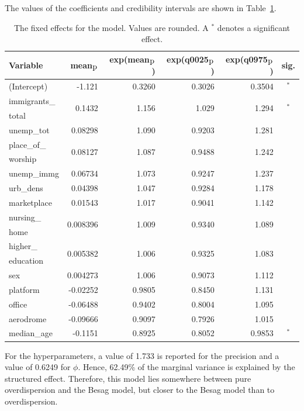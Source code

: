 %     
The values of the coefficients and credibility intervals are shown in Table~\ref{fixedAllNorway_spatial}.
\begin{table}[H]
\caption{The fixed effects for the model. Values are rounded. A $^*$ denotes a significant effect. \label{fixedAllNorway_spatial}}
\begin{tabular}{l r r r r c}
\toprule
\textbf{Variable}	& \textbf{mean$_{\hbox{p}}$}	& \textbf{exp(mean$_{\hbox{p}}$)} & \textbf{exp(q0025$_{\hbox{p}}$)} & \textbf{exp(q0975$_{\hbox{p}}$)} & \textbf{sig.}\\
\midrule
(Intercept) & -1.121 & 0.3260 & 0.3026 & 0.3504 & $^*$ \\
immigrants\_ & \multirow{2}{*}{0.1432} & \multirow{2}{*}{1.156} & \multirow{2}{*}{1.029} & \multirow{2}{*}{1.294} & \multirow{2}{*}{$^*$} \\
total \\
unemp\_tot & 0.08298 & 1.090 & 0.9203 & 1.281 \\
place\_of\_ & \multirow{2}{*}{0.08127} & \multirow{2}{*}{1.087} & \multirow{2}{*}{0.9488} & \multirow{2}{*}{1.242} \\
worship \\
unemp\_immg & 0.06734 & 1.073 & 0.9247 & 1.237 & \\
urb\_dens & 0.04398 & 1.047 & 0.9284 & 1.178 \\
marketplace & 0.01543 & 1.017 & 0.9041 & 1.142 \\
nursing\_ & \multirow{2}{*}{0.008396} & \multirow{2}{*}{1.009} & \multirow{2}{*}{0.9340} & \multirow{2}{*}{1.089} \\
home \\
higher\_ & \multirow{2}{*}{0.005382} & \multirow{2}{*}{1.006} & \multirow{2}{*}{0.9325} & \multirow{2}{*}{1.083} \\
education\\
sex & 0.004273 & 1.006 & 0.9073 & 1.112\\
platform & -0.02252 & 0.9805 & 0.8450 & 1.131 \\
office & -0.06488 & 0.9402 & 0.8004 & 1.095 \\
aerodrome & -0.09666 & 0.9097 & 0.7926 & 1.015 \\
median\_age & -0.1151  & 0.8925 & 0.8052 & 0.9853 & $^*$ \\
\bottomrule
\end{tabular}
\end{table}
\clearpage
For the hyperparameters, a value of 1.733 is reported for the precision and a value of 0.6249 for $\phi$. Hence, 62.49\% of the marginal variance is explained by the structured effect. Therefore, this model lies somewhere between pure overdispersion and the Besag model, but closer to the Besag model than to overdispersion.
\clearpage
